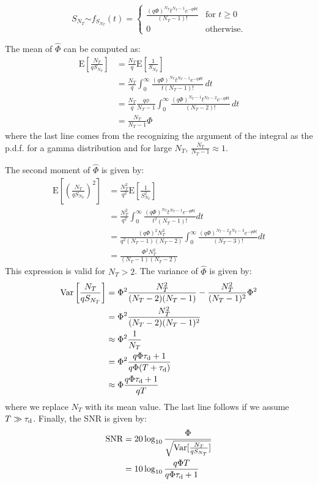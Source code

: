 \begin{equation}
S_{N_T}\stackrel{ }{\sim}f_{S_{N_T}}(t)=\begin{cases}
\frac{(q\Phi)^{N_T} t^{N_T-1} e^{-q\Phi t}}{(N_T-1)!} & \mbox{for } t\geq0\\
0 & \mbox{otherwise.}
\end{cases} \label{eq:gamma_interarrival_distr}
\end{equation}

The mean of $\widehat\Phi$ can be computed as: 
\begin{align}
  \text{E}\left[\frac{N_T}{q S_{N_T}}\right]&= \frac{N_T}{q}\text{E}\left[\frac{1}{S_{N_T}}\right] \nonumber\\
  &=  \frac{N_T}{q}\int^{\infty}_{0} \frac{(q\Phi)^{N_T} t^{N_T-1} e^{-q\Phi t}}{t(N_T-1)!}\, dt \nonumber\\
  &=  \frac{N_T}{q}\frac{q\phi}{N_T-1}\int^{\infty}_{0} \frac{(q\Phi)^{N_T-1} t^{N_T-2} e^{-q\Phi t}}{(N_T-2)!}\, dt\nonumber\\
  &= \frac{N_T}{N_T-1}\Phi \label{eq:bias}
\end{align}
where the last line comes from the recognizing the argument of the integral as
the p.d.f. for a gamma distribution and for large $N_T$, $\frac{N_T}{N_T-1}
\approx 1$.

The second moment of $\widehat\Phi$ is given by:
\begin{align}
  \text{E}\left[\left(\frac{N_T}{q S_{N_T}}\right)^2\right] 
  &=\frac{N_T^2}{q^2}\text{E}\left[\frac{1}{S_{N_T}^2}\right] \nonumber\\
  &=\frac{N_T^2}{q^2}\int^{\infty}_{0} \frac{(q\Phi)^{N_T} t^{N_T-1} e^{-q\Phi t}}{t^2(N_T-1)!} dt\nonumber\\
  &=\frac{(q\Phi)^2N_T^2}{q^2(N_T-1)(N_T-2)}\int^{\infty}_{0} \frac{(q\Phi)^{N_T-2} t^{N_T-3} e^{-q\Phi t}}{(N_T-3)!} dt\nonumber\\
  &=\frac{\Phi^2 N_T^2}{(N_T-1)(N_T-2)}
\end{align}
This expression is valid for $N_T>2$. The variance of $\widehat\Phi$ is given by: 
\begin{align}
  \text{Var}\left[\frac{N_T}{q S_{N_T}}\right] &=\Phi^2\frac{N_T^2}{(N_T-2)(N_T-1)}-\frac{N_T^2}{(N_T-1)^2}\Phi^2 \nonumber \\
  &=\Phi^2\frac{N_T^2}{(N_T-2)(N_T-1)^2}\nonumber\\
  &\approx \Phi^2\frac{1}{N_T}\\
  &= \Phi^2 \frac{ q\Phi\tau_\text{d}+1}{q\Phi(T+\tau_\text{d})}\\
  &\approx \Phi \frac{ q\Phi\tau_\text{d}+1}{q T}
\end{align}
where we replace $N_T$ with its mean value. The last line follows if we assume
$T\gg\tau_\text{d}$.
Finally, the SNR is given by:
\begin{align}
  \text{SNR} &= 20\log_{10}\frac{\Phi}{\sqrt{\text{Var}[\frac{N_T}{q S_{N_T}}]}} \nonumber\\
  &= 10\log_{10}\frac{q\Phi T}{ q\Phi \tau_\text{d}+1}
  \label{eq:SNRTiming}
\end{align}

